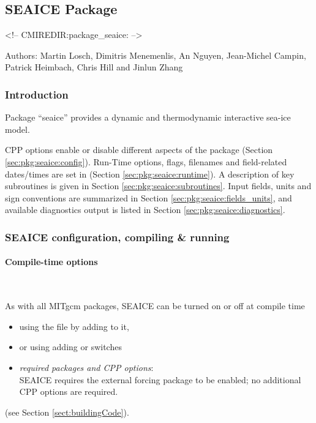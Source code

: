 


\subsection{SEAICE Package}
\label{sec:pkg:seaice}
\begin{rawhtml}
<!-- CMIREDIR:package_seaice: -->
\end{rawhtml}

Authors: Martin Losch, Dimitris Menemenlis, An Nguyen, Jean-Michel Campin,
Patrick Heimbach, Chris Hill and Jinlun Zhang

\subsubsection{Introduction
\label{sec:pkg:exf:intro}}


Package ``seaice'' provides a dynamic and thermodynamic interactive
sea-ice model. 

CPP options enable or disable different aspects of the package
(Section \ref{sec:pkg:seaice:config}).
Run-Time options, flags, filenames and field-related dates/times are
set in 
(Section \ref{sec:pkg:seaice:runtime}).
A description of key subroutines is given in Section
\ref{sec:pkg:seaice:subroutines}.
Input fields, units and sign conventions are summarized in
Section \ref{sec:pkg:seaice:fields_units}, and available diagnostics
output is listed in Section \ref{sec:pkg:seaice:diagnostics}.


\subsubsection{SEAICE configuration, compiling \& running}

\paragraph{Compile-time options
\label{sec:pkg:seaice:config}}
~

As with all MITgcm packages, SEAICE can be turned on or off at compile time
%
\begin{itemize}
%
\item
using the  file by adding  to it,
%
\item
or using  adding
 or  switches
%
\item
\textit{required packages and CPP options}: \\
SEAICE requires the external forcing package  to be enabled;
no additional CPP options are required.
%
\end{itemize}
(see Section \ref{sect:buildingCode}).

